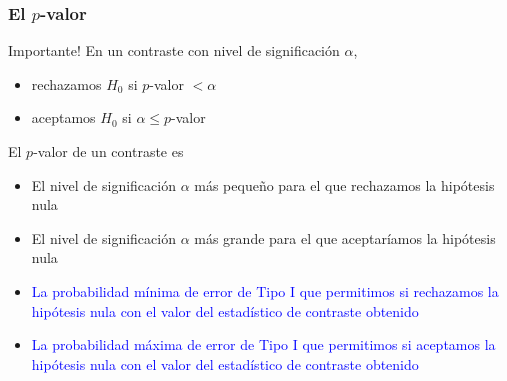 \documentclass[12pt,t]{beamer}\usepackage[]{graphicx}\usepackage[]{color}
\newcommand{\blue}[1]{\textcolor{blue}{#1}}
\renewcommand{\emph}[1]{{\color{red}#1}}
\renewcommand{\leq}{\leqslant}
\theoremstyle{plain}
\theoremstyle{definition}
\begin{document}
\begin{frame}
\frametitle{El $p$-valor}
\vspace*{-3ex}

\begin{block}{Importante!}
En un contraste con nivel de significación $\alpha$, 
\begin{itemize}
\item rechazamos $H_0$ si $p$-valor $<\alpha$

\item aceptamos $H_0$ si $\alpha\leq p$-valor
\end{itemize}
\end{block}
\medskip

El  \emph{$p$-valor}  de un contraste    es 
\begin{itemize}
\item  El nivel   de significación   $\alpha$ más pequeño para el que rechazamos  la hipótesis nula
\medskip

\item El nivel   de significación   $\alpha$ más grande para el que aceptaríamos la hipótesis nula
\medskip

\item \blue{La probabilidad mínima de error de Tipo  I que permitimos  si rechazamos la hipótesis nula con el valor del estadístico de contraste obtenido}

\item \blue{La probabilidad máxima de error de Tipo  I que permitimos  si aceptamos la hipótesis nula con el valor del estadístico de contraste
obtenido}
\end{itemize}
\end{frame}
\end{document}
